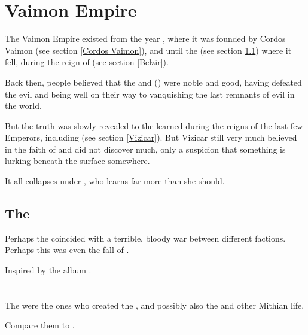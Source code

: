 \section{Vaimon Empire}
The Vaimon Empire existed from the year , where it was founded by Cordos Vaimon (see section \ref{Cordos Vaimon}), and until the \Darkfall{} (see section \ref{Darkfall}) where it fell, during the reign of \Belzir{} (see section \ref{Belzir}). 

\label{Vaimon Empire nativete}
Back then, people believed that the \Sephiroth{} and \angels{} (\resphain) were noble and good, having defeated the evil \pdaemons{} and being well on their way to vanquishing the last remnants of evil in the world. 

But the truth was slowly revealed to the learned during the reigns of the last few Emperors, including \VizicarFull{} (see section \ref{Vizicar}). But Vizicar still very much believed in the faith of \iquin{} and did not discover much, only a suspicion that something is lurking beneath the surface somewhere.

It all collapses under \Belzir, who learns far more than she should.







\subsection{The \Darkfall}
\label{Darkfall}
Perhaps the \Darkfall{} coincided with a terrible, bloody war between different \Resphan{} factions. Perhaps this was even the fall of \Kezerad. 

Inspired by the album .















\section{\Voyagers}
The \voyagers{} were the ones who created the \banes, and possibly also the \nephilim{} and other Mithian life. 

Compare them to .

